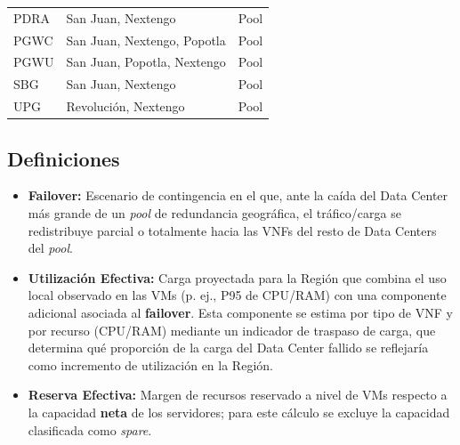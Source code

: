 \documentclass[11pt,a4paper]{article}
\begin{document}
\begin{table}[H]
{\begin{tabular}{@{}lll@{}}
PDRA &
San Juan, Nextengo &
Pool \\



PGWC &
San Juan, Nextengo, Popotla &
Pool \\



PGWU &
San Juan, Popotla, Nextengo &
Pool \\



SBG &
San Juan, Nextengo &
Pool \\



UPG &
Revolución, Nextengo &
Pool \\



\bottomrule
\end{tabular}%
}
\end{table}


\subsection{Definiciones}
\label{sec:definiciones_utilizacion}

\begin{itemize}
    \item \textbf{Failover:} Escenario de contingencia en el que, ante la caída del Data Center más grande de un \textit{pool} de redundancia geográfica, el tráfico/carga se redistribuye parcial o totalmente hacia las VNFs del resto de Data Centers del \textit{pool}.
    \item \textbf{Utilización Efectiva:} Carga proyectada para la Región que combina el uso local observado en las VMs (p. ej., P95 de CPU/RAM) con una componente adicional asociada al \textbf{failover}. Esta componente se estima por tipo de VNF y por recurso (CPU/RAM) mediante un indicador de traspaso de carga, que determina qué proporción de la carga del Data Center fallido se reflejaría como incremento de utilización en la Región.
    \item \textbf{Reserva Efectiva:} Margen de recursos reservado a nivel de VMs respecto a la capacidad \textbf{neta} de los servidores; para este cálculo se excluye la capacidad clasificada como \textit{spare}.
\end{itemize}
\end{document}
